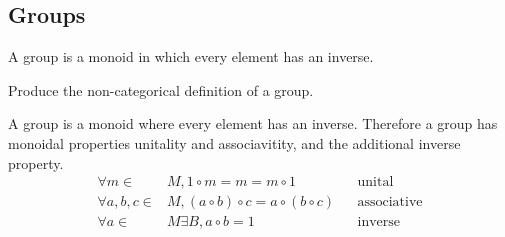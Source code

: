 \subsection{Groups}
\begin{definition}
A group is a monoid in which every element has an inverse.
\end{definition}

\begin{ttta}
Produce the non-categorical definition of a group.
\end{ttta}
A group is a monoid where every element has an inverse. Therefore a group has
monoidal properties unitality and associavitity, and the additional inverse
property.
\begin{align*}
    \forall m \in& M, 1\circ m = m = m \circ 1&&\text{unital}\\
    \forall a, b, c \in& M, (a\circ b)\circ c = a \circ (b \circ c)&&\text{associative}\\
    \forall a\in& M \exists B,  a\circ b = 1 &&\text{inverse}
\end{align*}

